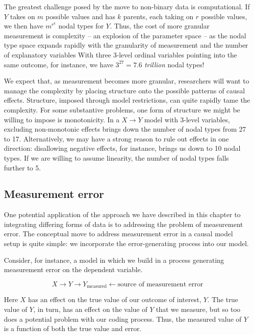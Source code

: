 \documentclass[
  12pt,
]{book}
\begin{document}
The greatest challenge posed by the move to non-binary data is computational. If \(Y\) takes on \(m\) possible values and has \(k\) parents, each taking on \(r\) possible values, we then have \(m^{r^k}\) nodal types for \(Y\). Thus, the cost of more granular measurement is complexity -- an explosion of the parameter space -- as the nodal type space expands rapidly with the granularity of measurement and the number of explanatory variables With three 3-level ordinal variables pointing into the same outcome, for instance, we have \(3^{27} = 7.6\) \emph{trillion} nodal types!

We expect that, as measurement becomes more granular, researchers will want to manage the complexity by placing structure onto the possible patterns of causal effects. Structure, imposed through model restrictions, can quite rapidly tame the complexity. For some substantive problems, one form of structure we might be willing to impose is monotonicity. In a \(X \rightarrow Y\) model with 3-level variables, excluding non-monotonic effects brings down the number of nodal types from 27 to 17. Alternatively, we may have a strong reason to rule out effects in one direction: disallowing negative effects, for instance, brings us down to 10 nodal types. If we are willing to assume linearity, the number of nodal types falls further to 5.

\hypertarget{measurement-error}{%
\subsection{Measurement error}\label{measurement-error}}

One potential application of the approach we have described in this chapter to integrating differing forms of data is to addressing the problem of measurement error. The conceptual move to address measurement error in a causal model setup is quite simple: we incorporate the error-generating process into our model.

Consider, for instance, a model in which we build in a process generating measurement error on the dependent variable.

\[X \rightarrow Y  \rightarrow Y_\text{measured} \leftarrow \text{source of measurement error}\]

Here \(X\) has an effect on the true value of our outcome of interest, \(Y\). The true value of \(Y\), in turn, has an effect on the value of \(Y\) that we measure, but so too does a potential problem with our coding process. Thus, the measured value of \(Y\) is a function of both the true value and error.
\end{document}
